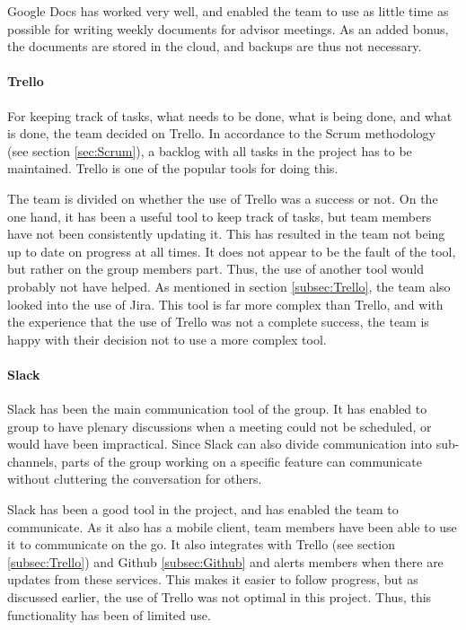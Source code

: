 \documentclass[11pt,a4paper,titlepage,oneside]{report}
\begin{document}
Google Docs has worked very well, and enabled the team to use as little time as possible for writing weekly documents for advisor meetings. As an added bonus, the documents are stored in the cloud, and backups are thus not necessary. 

\paragraph{Trello}
For keeping track of tasks, what needs to be done, what is being done, and what is done, the team decided on Trello. In accordance to the Scrum methodology (see section \ref{sec:Scrum}), a backlog with all tasks in the project has to be maintained. Trello is one of the popular tools for doing this. 

The team is divided on whether the use of Trello was a success or not. On the one hand, it has been a useful tool to keep track of tasks, but team members have not been consistently updating it. This has resulted in the team not being up to date on progress at all times. It does not appear to be the fault of the tool, but rather on the group members part. Thus, the use of another tool would probably not have helped. As mentioned in section \ref{subsec:Trello}, the team also looked into the use of Jira. This tool is far more complex than Trello, and with the experience that the use of Trello was not a complete success, the team is happy with their decision not to use a more complex tool. 

\paragraph{Slack}
Slack has been the main communication tool of the group. It has enabled to group to have plenary discussions when a meeting could not be scheduled, or would have been impractical. Since Slack can also divide communication into sub-channels, parts of the group working on a specific feature can communicate without cluttering the conversation for others.

Slack has been a good tool in the project, and has enabled the team to communicate. As it also has a mobile client, team members have been able to use it to communicate on the go. It also integrates with Trello (see section \ref{subsec:Trello}) and Github \ref{subsec:Github} and alerts members when there are updates from these services. This makes it easier to follow progress, but as discussed earlier, the use of Trello was not optimal in this project. Thus, this functionality has been of limited use. 
\end{document}
